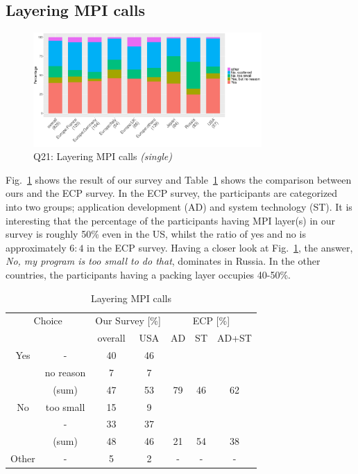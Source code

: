 \documentclass[preprint,5p,times]{elsarticle}
\def\myquote#1{{\it #1}}
\begin{document}
\subsection{Layering MPI calls}\label{sec:mpi-calls}

\begin{figure}[htb]
  \begin{center}
    \includegraphics[width=8.7cm]{R-scripts/Q21.pdf}
    \caption{Q21: Layering MPI calls {\it(single)}}
    \label{fig:layering-mpi-calls}
  \end{center}
\end{figure}

Fig.~\ref{fig:layering-mpi-calls} shows the result of our survey and
Table~\ref{tab:layering-mpi-calls} shows the comparison between ours
and the ECP survey. In the ECP survey, the participants are categorized
into two groups; application development (AD) and system technology
(ST). It is interesting that the percentage of the participants having
MPI layer(s) in our survey is roughly 50\% even in the US, whilst the
ratio of yes and no is approximately $6:4$ in the ECP survey.
Having a closer look at Fig.~\ref{fig:layering-mpi-calls}, the answer,
\myquote{No, my program is too small to do that}, dominates in Russia. In
the other countries, the participants having a packing layer occupies
40-50\%.

\begin{table}[htb]%
  \begin{center}%
    \caption{Layering MPI calls}\label{tab:layering-mpi-calls}%
    \begin{tabular}{c|c||c|c||c|c|c}%
      \hline%
      \multicolumn{2}{c||}{Choice} & \multicolumn{2}{c||}{Our Survey [\%]} &
      \multicolumn{3}{c}{ECP [\%]} \\
      \cline{3-7}%
      \multicolumn{2}{c||}{} & overall & USA & AD & ST & AD+ST \\
      \hline%
      \hline%
      Yes & - & 40 & 46 & & & \\
      & no reason & 7 & 7 & & & \\
      \cline{2-4}%
      & (sum) & 47 & 53 &  79 & 46 & 62 \\
      \hline%
      \hline%
      No & too small & 15 & 9 & & & \\
      & - & 33 & 37 & & & \\
      \cline{2-4}%
      & (sum) & 48 & 46 & 21 & 54 & 38 \\
      \hline%
      \hline%
      Other & - & 5 & 2 & - & - & - \\
      \hline%
    \end{tabular}%
  \end{center}%
\end{table}%
\end{document}
